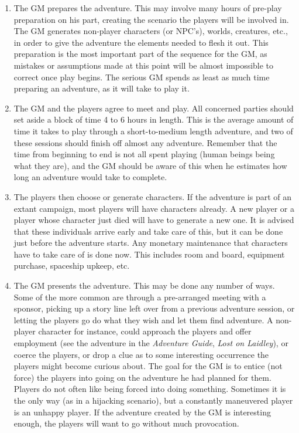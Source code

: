 \begin{enumerate}
\item The GM prepares the adventure.  This may involve many hours of
  pre-play preparation on his part, creating the scenario the players
  will be involved in.  The GM generates non-player characters (or
  NPC's), worlds, creatures, etc., in order to give the adventure the
  elements needed to flesh it out.  This preparation is the most
  important part of the sequence for the GM, as mistakes or
  assumptions made at this point will be almost impossible to correct
  once play begins.  The serious GM spends as least as much time
  preparing an adventure, as it will take to play it.
  
\item The GM and the players agree to meet and play.  All concerned
  parties should set aside a block of time 4 to 6 hours in length.
  This is the average amount of time it takes to play through a
  short-to-medium length adventure, and two of these sessions should
  finish off almost any adventure.  Remember that the time from
  beginning to end is not all spent playing (human beings being what
  they are), and the GM should be aware of this when he estimates how
  long an adventure would take to complete.
  
\item The players then choose or generate characters.  If the
  adventure is part of an extant campaign, most players will have
  characters already.  A new player or a player whose character just
  died will have to generate a new one.  It is advised that these
  individuals arrive early and take care of this, but it can be done
  just before the adventure starts.  Any monetary maintenance that
  characters have to take care of is done now.  This includes room and
  board, equipment purchase, spaceship upkeep, etc.
  
\item The GM presents the adventure.  This may be done any number of
  ways.  Some of the more common are through a pre-arranged meeting
  with a sponsor, picking up a story line left over from a previous
  adventure session, or letting the players go do what they wish and
  let them find adventure.  A non-player character for instance, could
  approach the players and offer employment (see the adventure in the
  \emph{Adventure Guide}, \emph{Lost on Laidley}), or coerce the players, or
  drop a clue as to some interesting occurrence the players might
  become curious about.  The goal for the GM is to entice (not force)
  the players into going on the adventure he had planned for them.
  Players do not often like being forced into doing something.
  Sometimes it is the only way (as in a hijacking scenario), but a
  constantly maneuvered player is an unhappy player.  If the adventure
  created by the GM is interesting enough, the players will want to go
  without much provocation.
  

\end{enumerate}
